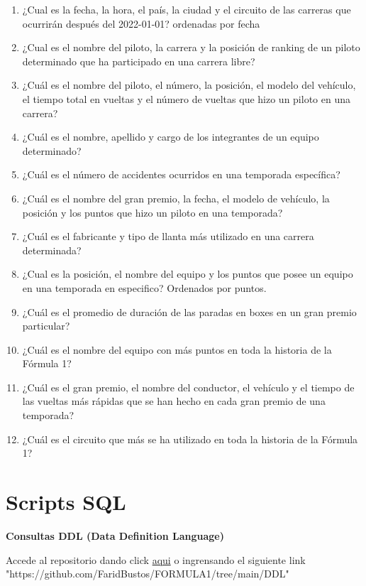 \documentclass{article}
\begin{document}
\begin{enumerate}
		\item ¿Cual es la fecha, la hora, el país, la ciudad y el circuito de las carreras que ocurrirán después del 2022-01-01? ordenadas por fecha
		\item ¿Cual es el nombre del piloto, la carrera y la posición de ranking de un piloto determinado que ha participado en una carrera libre?
		\item ¿Cuál es el nombre del piloto, el número, la posición, el modelo del vehículo, el tiempo total en vueltas y el número de vueltas que hizo un piloto en una carrera?
		\item ¿Cuál es el nombre, apellido y cargo de los integrantes de un equipo determinado?
		\item ¿Cuál es el número de accidentes ocurridos en una temporada específica?
		\item ¿Cuál es el nombre del gran premio, la fecha, el modelo de vehículo, la posición y los puntos que hizo un piloto en una temporada?
		\item ¿Cuál es el fabricante y tipo de llanta más utilizado en una carrera determinada?
		\item ¿Cual es la posición, el nombre del equipo y los puntos que posee un equipo en una temporada en especifico? Ordenados por puntos.
		\item ¿Cuál es el promedio de duración de las paradas en boxes en un gran premio particular?
		\item ¿Cuál es el nombre del equipo con más puntos en toda la historia de la Fórmula 1?
		\item ¿Cuál es el gran premio, el nombre del conductor, el vehículo y el tiempo de las vueltas más rápidas que se han hecho en cada gran premio de una temporada?
		\item ¿Cuál es el circuito que más se ha utilizado en toda la historia de la Fórmula 1?
		
	\end{enumerate}
	
	\section{Scripts SQL}
	\Large{\textbf{Consultas DDL (Data Definition Language)}} \par
	
	
		\textnormal{Accede al repositorio dando click \href{https://github.com/FaridBustos/FORMULA1/tree/main/DDL}{aqui}  o ingrensando el siguiente link "https://github.com/FaridBustos/FORMULA1/tree/main/DDL"}
	
\end{document}
